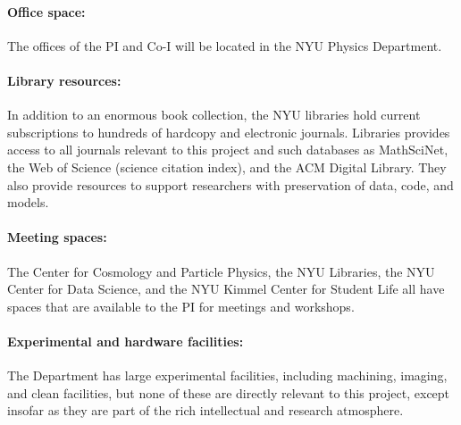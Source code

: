 \documentclass[12pt]{article}
\begin{document}
\paragraph{Office space:}
The offices of the PI and Co-I will be located in the NYU Physics
Department.

\paragraph{Library resources:}
In addition to an enormous book collection, the NYU libraries hold
current subscriptions to hundreds of hardcopy and electronic journals.
Libraries provides access to all journals relevant to this project and such
databases as MathSciNet, the Web of Science (science citation index),
and the ACM Digital Library. They also provide resources to support
researchers with preservation of data, code, and models.

\paragraph{Meeting spaces:}
The Center for Cosmology and Particle Physics, the NYU Libraries, the
NYU Center for Data Science, and the NYU Kimmel Center for Student
Life all have spaces that are available to the PI for meetings and
workshops.

\paragraph{Experimental and hardware facilities:}
The Department has large experimental facilities, including machining,
imaging, and clean facilities, but none of these are directly relevant
to this project, except insofar as they are part of the rich
intellectual and research atmosphere.
\end{document}
